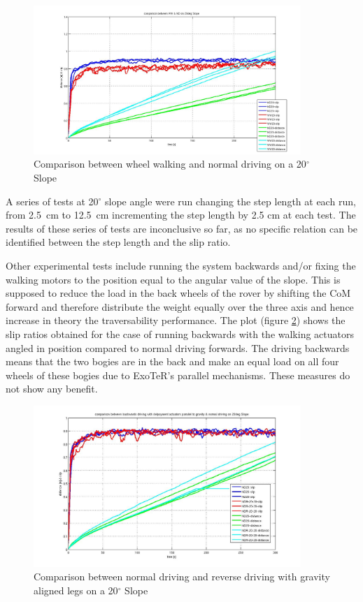 \documentclass[a4paper,twocolumn]{esapub2005} %
\begin{document}
\begin{figure}[h!]
    \centering
    \includegraphics[width=0.9\textwidth]{20d.jpg}	\caption{Comparison between
    wheel walking and normal driving on a 20$^{\circ}$ Slope} \label{fig:20d}
\end{figure}



A series of tests at 20$^{\circ}$ slope angle were run changing the step length
at each run, from 2.5~\unit{cm} to 12.5~\unit{cm} incrementing the step length by 2.5 cm at
each test. The results of these series of tests are inconclusive so far, as no
specific relation can be identified between the step length and the slip ratio.

Other experimental tests include running the system backwards and/or fixing the
walking motors to the position equal to the angular value of the slope. This is
supposed to reduce the load in the back wheels of the rover by shifting the CoM
forward and therefore distribute the weight equally over the three axis and
hence increase in theory the traversability performance. The plot (figure
\ref{fig:ndr20d}) shows the slip ratios obtained for the case of running
backwards with the walking actuators angled in position compared to normal
driving forwards. The driving backwards means that the two bogies are in the
back and make an equal load on all four wheels of these bogies due to ExoTeR's
parallel mechanisms.  These measures do not show any benefit.


\begin{figure}[h!]
    \centering
    \includegraphics[width=0.9\textwidth]{ndr20d.jpg}	\caption{Comparison between
    normal driving and reverse driving with gravity aligned legs on a 20$^{\circ}$ Slope}
    \label{fig:ndr20d}
\end{figure}
\end{document}

